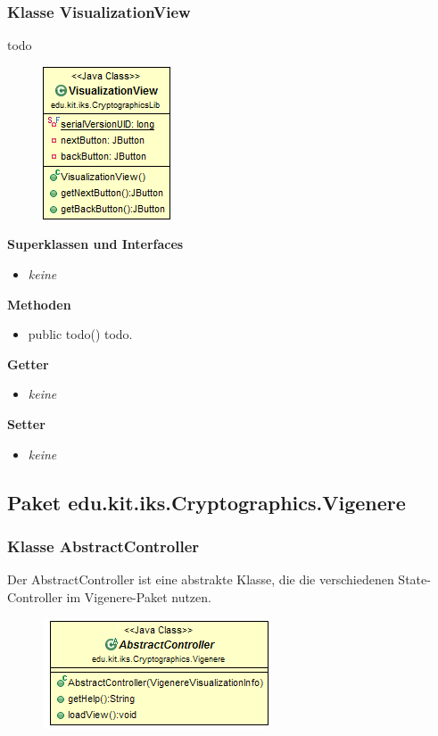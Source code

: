 \documentclass{article}
\begin{document}
	\subsubsection{Klasse VisualizationView}
	  todo
	
      \begin{figure}[H]
        \centering
        \includegraphics{resources/edu-kit-iks-CryptographicsLib-VisualizationView}
      \end{figure}
	
      \textbf{Superklassen und Interfaces}
      \begin{itemize}
        \item \textit{keine}
      \end{itemize}
	
      \textbf{Methoden}
      \begin{itemize}
        \item public todo() \newline
          todo.
      \end{itemize}
      
      \textbf{Getter}
      \begin{itemize}
		\item \textit{keine}
      \end{itemize}
      
      \textbf{Setter}
      \begin{itemize}
        \item \textit{keine}
      \end{itemize}
	
  \subsection{Paket edu.kit.iks.Cryptographics.Vigenere}
    \subsubsection{Klasse AbstractController}
      Der AbstractController ist eine abstrakte Klasse, die die verschiedenen State-Controller im Vigenere-Paket nutzen.
      \begin{figure}[H]
        \centering
        \includegraphics{resources/edu-kit-iks-Cryptographics-Vigenere-AbstractController}
      \end{figure}
\end{document}
